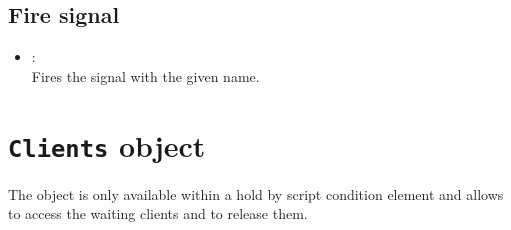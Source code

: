 \section{Fire signal}

\begin{itemize}

\item
{}:\\
Fires the signal with the given name.

\end{itemize}



\chapter{\texttt{Clients} object}

The  object is only available within a hold by script condition element
and allows to access the waiting clients and to release them.

